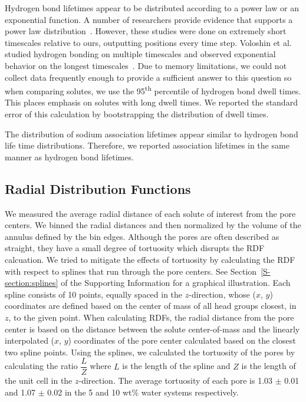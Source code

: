 \documentclass[journal=jpcbfk,manuscript=article]{achemso}
\begin{document}
  Hydrogen bond lifetimes appear to be distributed according to a power law or an
  exponential function. A number of researchers provide evidence that supports a 
  power law distribution~\cite{starr_fast_1999,martiniano_insights_2013}. However, these
  studies were done on extremely short timescales relative to ours, outputting positions
  every time step. Voloshin et al. studied hydrogen bonding on multiple timescales and 
  observed exponential behavior on the longest timescales~\cite{voloshin_hydrogen_2009}. 
  Due to memory limitations, we could not collect data frequently enough to provide a
  sufficient answer to this question so when comparing solutes, we use the 95\textsuperscript{th} 
  percentile of hydrogen bond dwell times. This places emphasis on solutes with 
  long dwell times. We reported the standard error of this calculation by bootstrapping
  the distribution of dwell times.
  
  The distribution of sodium association lifetimes appear similar to
  hydrogen bond life time distributions. Therefore, we reported association
  lifetimes in the same manner as hydrogen bond lifetimes.
  
  \subsection{Radial Distribution Functions}\label{method:rdfs}

  We measured the average radial distance of each solute of interest 
  from the pore centers. We binned the radial distances and then 
  normalized by the volume of the annulus defined by the bin edges.
  Although the pores are often described as straight, they have a
  small degree of tortuosity which disrupts the RDF calcuation. We 
  tried to mitigate the effects of tortuosity by calculating the RDF
  with respect to splines that run through the pore centers. See
  Section~\ref{S-section:splines} of the Supporting Information for 
  a graphical illustration. Each spline consists of 10 points, equally
  spaced in the $z$-direction, whose ($x$, $y$) coordinates are defined
  based on the center of mass of all head groups closest, in $z$, to the
  given point. When calculating RDFs, the radial distance from the pore 
  center is based on the distance between the solute center-of-mass and
  the linearly interpolated ($x$, $y$) coordinates of the pore center 
  calculated based on the closest two spline points. Using the splines, 
  we calculated the tortuosity of the pores by calculating the ratio 
  $\dfrac{L}{Z}$ where $L$ is the length of the spline and $Z$ is the 
  length of the unit cell in the $z$-direction. The average tortuosity
  of each pore is 1.03 $\pm$ 0.01 and 1.07 $\pm$ 0.02 in the 5 and 10 wt\%
  water systems respectively.
  
\end{document}
